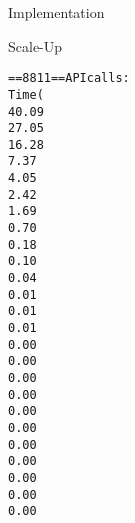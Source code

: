 \documentclass{article}
\begin{document}
\begin{section}{Implementation}
\begin{subsection}{Scale-Up}
\begin{paragraph}{}
\begin{alltt}
          ==8811== API calls:
          Time(%)      Time     Calls       Avg       Min       Max  Name
          40.09%  156.51ms      2054  76.199us  3.9950us  35.060ms  cuStreamSynchronize
          27.05%  105.60ms         1  105.60ms  105.60ms  105.60ms  cuDevicePrimaryCtxRetain
          16.28%  63.552ms         1  63.552ms  63.552ms  63.552ms  cuDevicePrimaryCtxRelease
          7.37%  28.755ms      5144  5.5900us  5.0030us  363.46us  cuMemcpyDtoDAsync
          4.05%  15.824ms         1  15.824ms  15.824ms  15.824ms  cuMemHostAlloc
          2.42%  9.4366ms         1  9.4366ms  9.4366ms  9.4366ms  cuMemFreeHost
          1.69%  6.6098ms      2049  3.2250us  2.9770us  23.551us  cuMemcpyHtoDAsync
          0.70%  2.7276ms     10288     265ns     208ns  13.388us  cuPointerGetAttributes
          0.18%  719.74us         4  179.93us  4.3360us  264.30us  cuMemAlloc
          0.10%  405.40us         1  405.40us  405.40us  405.40us  cuMemAllocHost
          0.04%  158.18us         1  158.18us  158.18us  158.18us  cuModuleLoadData
          0.01%  44.311us         1  44.311us  44.311us  44.311us  cuStreamCreate
          0.01%  26.994us         4  6.7480us  5.5120us  9.2010us  cuLaunchKernel
          0.01%  19.681us         3  6.5600us  1.0700us  17.235us  cuDeviceGet
          0.00%  11.049us         1  11.049us  11.049us  11.049us  cuMemcpyDtoHAsync
          0.00%  5.9280us         3  1.9760us     486ns  3.7500us  cuDeviceGetCount
          0.00%  3.9700us         4     992ns     821ns  1.4170us  cuDeviceGetAttribute
          0.00%  2.9060us         2  1.4530us     469ns  2.4370us  cuEventCreate
          0.00%  2.1130us         1  2.1130us  2.1130us  2.1130us  cuEventRecord
          0.00%  1.9380us         3     646ns     257ns  1.2730us  cuCtxSetCurrent
          0.00%  1.2690us         1  1.2690us  1.2690us  1.2690us  cuModuleGetFunction
          0.00%  1.0160us         1  1.0160us  1.0160us  1.0160us  cuEventSynchronize
          0.00%     941ns         1     941ns     941ns     941ns  cuDeviceComputeCapability
          0.00%     903ns         1     903ns     903ns     903ns  cuCtxGetCurrent
          0.00%     429ns         1     429ns     429ns     429ns  cuMemFree


\end{alltt}
\end{paragraph}
\end{subsection}
\end{section}
\end{document}
